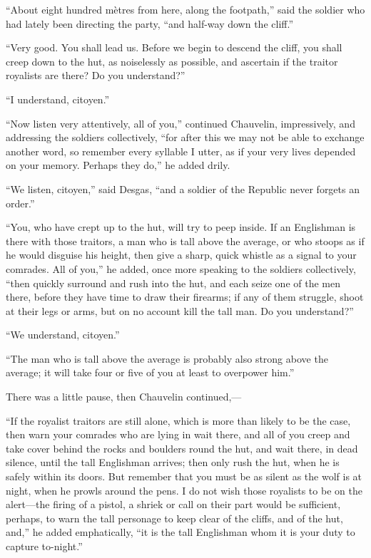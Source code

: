\documentclass[paper=a5,BCOR=7mm,twoside,DIV=calc,12pt,usegeometry,chapterprefix,endperiod,headings=big]{scrbook}
\begin{document}
\enquote{About eight hundred mètres from here, along the footpath,} said the soldier who had lately been directing the party, \enquote{and half-way down the cliff.}

\enquote{Very good. You shall lead us. Before we begin to descend the cliff, you shall creep down to the hut, as noiselessly as possible, and ascertain if the traitor royalists are there? Do you understand?}

\enquote{I understand, citoyen.}

\enquote{Now listen very attentively, all of you,} continued Chauvelin, impressively, and addressing the soldiers collectively, \enquote{for after this we may not be able to exchange another word, so remember every syllable I utter, as if your very lives depended on your memory. Perhaps they do,} he added drily.

\enquote{We listen, citoyen,} said Desgas, \enquote{and a soldier of the Republic never forgets an order.}

\enquote{You, who have crept up to the hut, will try to peep inside. If an Englishman is there with those traitors, a man who is tall above the average, or who stoops as if he would disguise his height, then give a sharp, quick whistle as a signal to your comrades. All of you,} he added, once more speaking to the soldiers collectively, \enquote{then quickly surround and rush into the hut, and each seize one of the men there, before they have time to draw their firearms; if any of them struggle, shoot at their legs or arms, but on no account kill the tall man. Do you understand?}

\enquote{We understand, citoyen.}

\enquote{The man who is tall above the average is probably also strong above the average; it will take four or five of you at least to overpower him.}

There was a little pause, then Chauvelin continued,---

\enquote{If the royalist traitors are still alone, which is more than likely to be the case, then warn your comrades who are lying in wait there, and all of you creep and take cover behind the rocks and boulders round the hut, and wait there, in dead silence, until the tall Englishman arrives; then only rush the hut, when he is safely within its doors. But remember that you must be as silent as the wolf is at night, when he prowls around the pens. I do not wish those royalists to be on the alert---the firing of a pistol, a shriek or call on their part would be sufficient, perhaps, to warn the tall personage to keep clear of the cliffs, and of the hut, and,} he added emphatically, \enquote{it is the tall Englishman whom it is your duty to capture to-night.}
\end{document}
